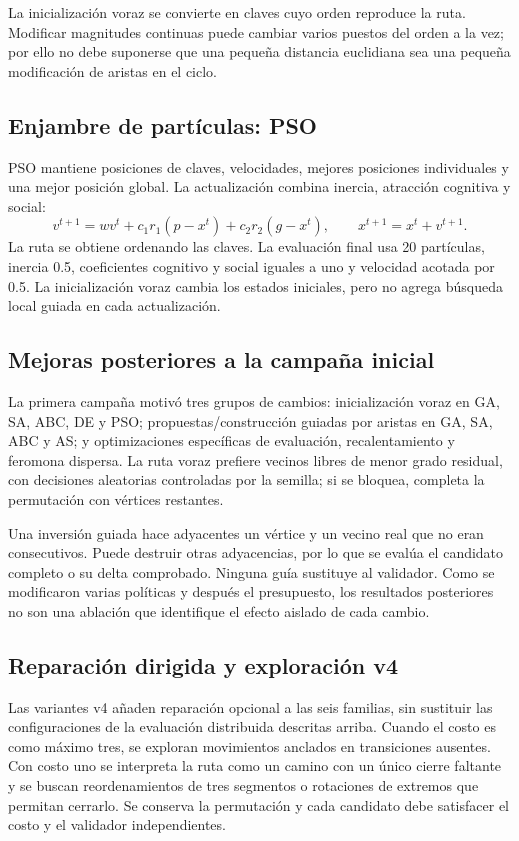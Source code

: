 La inicialización voraz se convierte en claves cuyo orden reproduce la ruta. Modificar magnitudes continuas puede cambiar varios puestos del orden a la vez; por ello no debe suponerse que una pequeña distancia euclidiana sea una pequeña modificación de aristas en el ciclo.

\subsection{Enjambre de partículas: PSO}
PSO mantiene posiciones de claves, velocidades, mejores posiciones individuales y una mejor posición global. La actualización combina inercia, atracción cognitiva y social:
\[
 v^{t+1}=w v^t+c_1 r_1(p-x^t)+c_2 r_2(g-x^t),\qquad x^{t+1}=x^t+v^{t+1}.
\]
La ruta se obtiene ordenando las claves. La evaluación final usa 20 partículas, inercia 0.5, coeficientes cognitivo y social iguales a uno y velocidad acotada por 0.5. La inicialización voraz cambia los estados iniciales, pero no agrega búsqueda local guiada en cada actualización.

\subsection{Mejoras posteriores a la campaña inicial}
La primera campaña motivó tres grupos de cambios: inicialización voraz en GA, SA, ABC, DE y PSO; propuestas/construcción guiadas por aristas en GA, SA, ABC y AS; y optimizaciones específicas de evaluación, recalentamiento y feromona dispersa. La ruta voraz prefiere vecinos libres de menor grado residual, con decisiones aleatorias controladas por la semilla; si se bloquea, completa la permutación con vértices restantes.

Una inversión guiada hace adyacentes un vértice y un vecino real que no eran consecutivos. Puede destruir otras adyacencias, por lo que se evalúa el candidato completo o su delta comprobado. Ninguna guía sustituye al validador. Como se modificaron varias políticas y después el presupuesto, los resultados posteriores no son una ablación que identifique el efecto aislado de cada cambio.

\subsection{Reparación dirigida y exploración v4}
Las variantes v4 añaden reparación opcional a las seis familias, sin sustituir las configuraciones de la evaluación distribuida descritas arriba. Cuando el costo es como máximo tres, se exploran movimientos anclados en transiciones ausentes. Con costo uno se interpreta la ruta como un camino con un único cierre faltante y se buscan reordenamientos de tres segmentos o rotaciones de extremos que permitan cerrarlo. Se conserva la permutación y cada candidato debe satisfacer el costo y el validador independientes.

